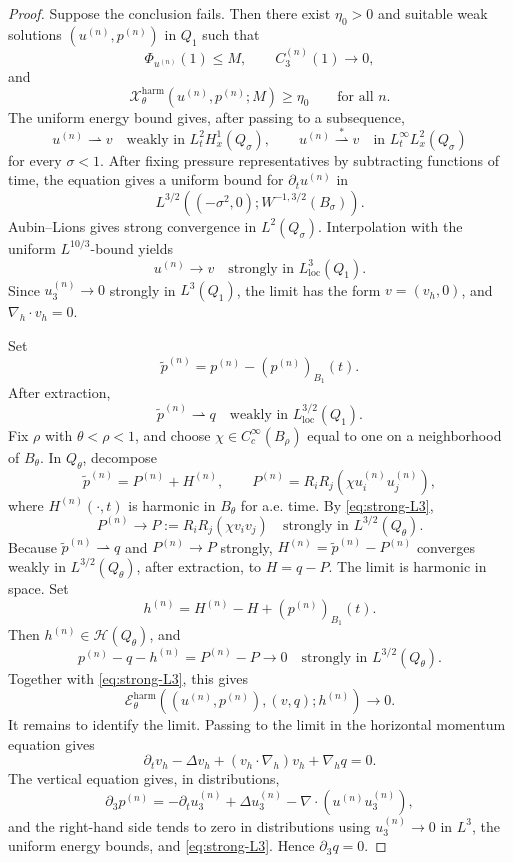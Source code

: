 \documentclass[pdflatex,sn-mathphys-num]{sn-jnl}
\numberwithin{equation}{section}
\theoremstyle{thmstyleone}
\theoremstyle{thmstylethree}
\newcommand{\loc}{\mathrm{loc}}
\newcommand{\nabh}{\nabla_h}
\newcommand{\calH}{\mathcal H}
\newcommand{\calE}{\mathcal E}
\newcommand{\calX}{\mathcal X}
\newcommand{\harm}{\mathrm{harm}}
\begin{document}
\begin{proof}
Suppose the conclusion fails.  Then there exist \(\eta_0>0\) and suitable weak solutions \((u^{(n)},p^{(n)})\) in \(Q_1\) such that
\[
        \Phi_{u^{(n)}}(1)\le M,
        \qquad
        C^{(n)}_3(1)\to0,
\]
and
\[
        \calX^{\harm}_\theta(u^{(n)},p^{(n)};M)\ge\eta_0
        \qquad\text{for all }n.
\]
The uniform energy bound gives, after passing to a subsequence,
\[
        u^{(n)}\rightharpoonup v\quad\text{weakly in }L^2_tH^1_x(Q_\sigma),
        \qquad
        u^{(n)}\stackrel{*}{\rightharpoonup} v\quad\text{in }L^\infty_tL^2_x(Q_\sigma)
\]
for every \(\sigma<1\).  After fixing pressure representatives by subtracting functions of time, the equation gives a uniform bound for \(\partial_tu^{(n)}\) in
\[
        L^{3/2}((-\sigma^2,0);W^{-1,3/2}(B_\sigma)).
\]
Aubin--Lions gives strong convergence in \(L^2(Q_\sigma)\).  Interpolation with the uniform \(L^{10/3}\)-bound yields
\begin{equation}
        u^{(n)}\to v\quad\text{strongly in }L^3_{\loc}(Q_1).
        \label{eq:strong-L3}
\end{equation}
Since \(u^{(n)}_3\to0\) strongly in \(L^3(Q_1)\), the limit has the form \(v=(v_h,0)\), and \(\nabh\cdot v_h=0\).

Set
\[
        \widetilde p^{(n)}=p^{(n)}-(p^{(n)})_{B_1}(t).
\]
After extraction,
\[
        \widetilde p^{(n)}\rightharpoonup q
        \quad\text{weakly in }L^{3/2}_{\loc}(Q_1).
\]
Fix \(\rho\) with \(\theta<\rho<1\), and choose \(\chi\in C_c^\infty(B_\rho)\) equal to one on a neighborhood of \(B_\theta\).  In \(Q_\theta\), decompose
\[
        \widetilde p^{(n)}=P^{(n)}+H^{(n)},
        \qquad
        P^{(n)}=R_iR_j(\chi u_i^{(n)}u_j^{(n)}),
\]
where \(H^{(n)}(\cdot,t)\) is harmonic in \(B_\theta\) for a.e. time.  By \eqref{eq:strong-L3},
\[
        P^{(n)}\to P:=R_iR_j(\chi v_iv_j)
        \quad\text{strongly in }L^{3/2}(Q_\theta).
\]
Because \(\widetilde p^{(n)}\rightharpoonup q\) and \(P^{(n)}\to P\) strongly, \(H^{(n)}=\widetilde p^{(n)}-P^{(n)}\) converges weakly in \(L^{3/2}(Q_\theta)\), after extraction, to \(H=q-P\).  The limit is harmonic in space.  Set
\[
        h^{(n)}=H^{(n)}-H+(p^{(n)})_{B_1}(t).
\]
Then \(h^{(n)}\in\calH(Q_\theta)\), and
\[
        p^{(n)}-q-h^{(n)}=P^{(n)}-P\to0
        \quad\text{strongly in }L^{3/2}(Q_\theta).
\]
Together with \eqref{eq:strong-L3}, this gives
\[
        \calE^{\harm}_\theta((u^{(n)},p^{(n)}),(v,q);h^{(n)})\to0.
\]
It remains to identify the limit.  Passing to the limit in the horizontal momentum equation gives
\[
        \partial_t v_h-\Delta v_h+(v_h\cdot\nabh)v_h+\nabh q=0.
\]
The vertical equation gives, in distributions,
\[
        \partial_3p^{(n)}
        =-\partial_tu^{(n)}_3+\Delta u^{(n)}_3-\nabla\cdot(u^{(n)}u^{(n)}_3),
\]
and the right-hand side tends to zero in distributions using \(u^{(n)}_3\to0\) in \(L^3\), the uniform energy bounds, and \eqref{eq:strong-L3}.  Hence \(\partial_3q=0\).


\end{proof}
\end{document}
